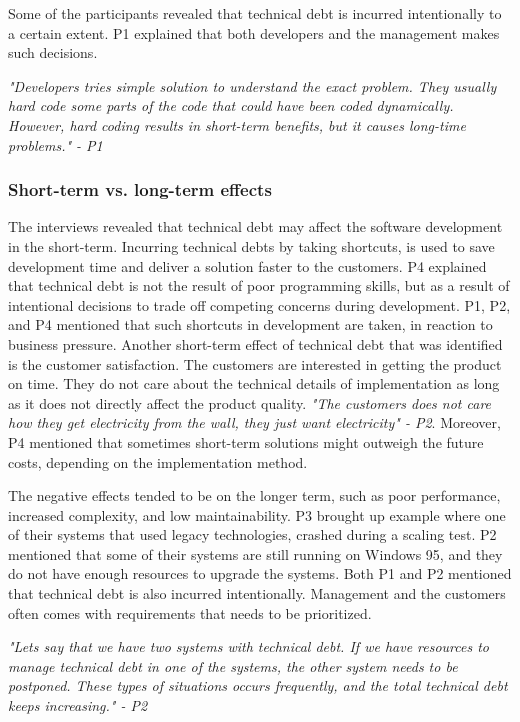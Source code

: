 Some of the participants revealed that technical debt is incurred intentionally to a certain extent. P1 explained that both developers and the management makes such decisions. 
\begin{displayquote}
    \textit{"Developers tries simple solution to understand the exact problem. They usually hard code some parts of the code that could have been coded dynamically. However, hard coding results in short-term benefits, but it causes long-time problems." - P1}
\end{displayquote}


\subsubsection{Short-term vs. long-term effects}
The interviews revealed that technical debt may affect the software development in the short-term. Incurring technical debts by taking shortcuts, is used to save development time and deliver a solution faster to the customers. P4 explained that technical debt is not the result of poor programming skills, but as a result of intentional decisions to trade off competing concerns during development. P1, P2, and P4 mentioned that such shortcuts in development are taken, in reaction to business pressure. Another short-term effect of technical debt that was identified is the customer satisfaction. The customers are interested in getting the product on time. They do not care about the technical details of implementation as long as it does not directly affect the product quality. \textit{"The customers does not care how they get electricity from the wall, they just want electricity" - P2}. Moreover, P4 mentioned that sometimes short-term solutions might outweigh the future costs, depending on the implementation method.

The negative effects tended to be on the longer term, such as poor performance, increased complexity, and low maintainability. P3 brought up example where one of their systems that used legacy technologies, crashed during a scaling test. P2 mentioned that some of their systems are still running on Windows 95, and they do not have enough resources to upgrade the systems. Both P1 and P2 mentioned that technical debt is also incurred intentionally. Management and the customers often comes with requirements that needs to be prioritized. 

\begin{displayquote}
    \textit{"Lets say that we have two systems with technical debt. If we have resources to manage technical debt in one of the systems, the other system needs to be postponed. These types of situations occurs frequently, and the total technical debt keeps increasing." - P2}
\end{displayquote}


